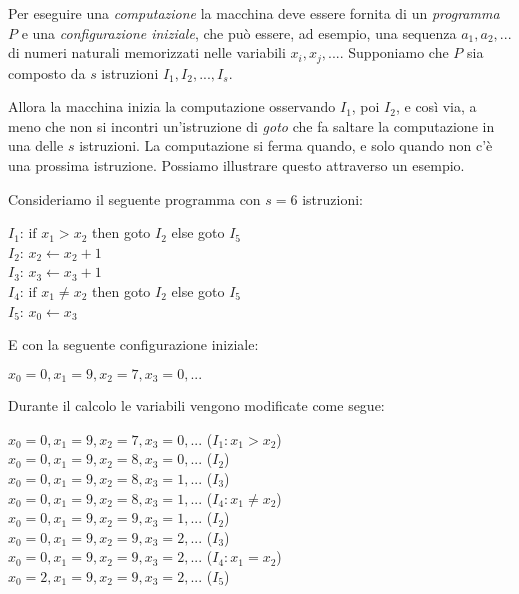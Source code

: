 Per eseguire una \emph{computazione} la macchina deve essere
fornita di un \emph{programma} $P$ e una \emph{configurazione
  iniziale}, che pu\`o essere, ad esempio, una sequenza $a_1, a_2,
...$ di numeri naturali memorizzati nelle variabili $x_i, x_j,
...$. Supponiamo che $P$ sia composto da $s$ istruzioni $I_1, I_2,...,
I_s$.

Allora la macchina inizia la computazione osservando $I_1$, poi $I_2$,
e cos\`i via, a meno che non si incontri un'istruzione di \emph{goto}
che fa saltare la computazione in una delle $s$ istruzioni. La
computazione si ferma quando, e solo quando non c'\`e una prossima
istruzione. Possiamo illustrare questo attraverso un esempio.
	
\begin{esempio} Consideriamo il seguente programma con $s=6$ istruzioni:
\begin{mylisting}
$I_1$: $\textrm{if }x_1 > x_2$ then goto $I_2$ else goto $I_5$
  \\ $I_2$: $x_2 \leftarrow x_2+1$\\ $I_3$: $x_3 \leftarrow
  x_3+1$\\ $I_4$: $\textrm{if }x_1 \neq x_2$ then goto $I_2$ else goto
  $I_5$\\ $I_5$: $x_0 \leftarrow x_3$\\
\end{mylisting}
E con la seguente configurazione iniziale:
\begin{mylisting}
$x_0 = 0, x_1 = 9, x_2 = 7, x_3 = 0, ...$
\end{mylisting}
Durante il calcolo le variabili vengono modificate come segue:
\begin{mylisting}	
$x_0 = 0, x_1 = 9, x_2 = 7, x_3 = 0, ...$ ($I_1: x_1 > x_2$)\\ $x_0 =
  0, x_1 = 9, x_2 = 8, x_3 = 0, ...$ ($I_2$)\\ $x_0 = 0, x_1 = 9, x_2
  = 8, x_3 = 1, ...$ ($I_3$)\\ $x_0 = 0, x_1 = 9, x_2 = 8, x_3 = 1,
  ...$ ($I_4: x_1 \neq x_2$)\\ $x_0 = 0, x_1 = 9, x_2 = 9, x_3 = 1,
  ...$ ($I_2$)\\ $x_0 = 0, x_1 = 9, x_2 = 9, x_3 = 2, ...$
  ($I_3$)\\ $x_0 = 0, x_1 = 9, x_2 = 9, x_3 = 2, ...$ ($I_4: x_1 =
  x_2$)\\ $x_0 = 2, x_1 = 9, x_2 = 9, x_3 = 2, ...$ ($I_5$)\\
\end{mylisting}	
\end{esempio}

